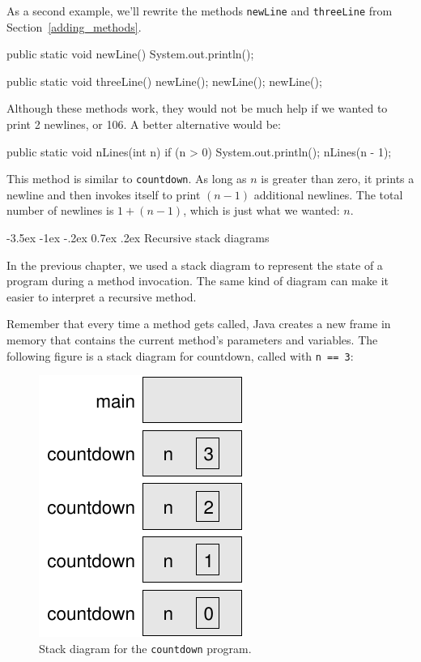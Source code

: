 \documentclass[12pt]{book}
\makeatletter
\renewcommand{\section}{\@startsection {section}{1}{\z@}%
    {-3.5ex \@plus -1ex \@minus -.2ex}%
    {0.7ex \@plus.2ex}%
    {\normalfont\Large\bfseries}}
\theoremstyle{exercise}
\newcommand{\java}[1]{\lstinline{#1}} %
\makeatother
\begin{document}
As a second example, we'll rewrite the methods \java{newLine} and \java{threeLine} from Section~\ref{adding_methods}.

\begin{code}
    public static void newLine() {
        System.out.println();
    }

    public static void threeLine() {
        newLine();
        newLine();
        newLine();
    }
\end{code}


Although these methods work, they would not be much help if we wanted to print 2 newlines, or 106.
A better alternative would be:

\begin{code}
    public static void nLines(int n) {
        if (n > 0) {
            System.out.println();
            nLines(n - 1);
        }
    }
\end{code}

This method is similar to \java{countdown}.
As long as $n$ is greater than zero, it prints a newline and then invokes itself to print $(n-1)$ additional newlines.
The total number of newlines is $1 + (n - 1)$, which is just what we wanted: $n$.


\section{Recursive stack diagrams}


In the previous chapter, we used a stack diagram to represent the state of a program during a method invocation.
The same kind of diagram can make it easier to interpret a recursive method.

Remember that every time a method gets called, Java creates a new frame in memory that contains the current method's parameters and variables.
The following figure is a stack diagram for countdown, called with \java{n == 3}:

\begin{figure}[!h]
\begin{center}
\includegraphics{figs/stack2.pdf}
\caption{Stack diagram for the \java{countdown} program.}
\end{center}
\end{figure}
\end{document}
